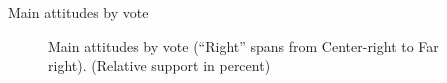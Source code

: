 \documentclass[aspectratio=169,xcolor=dvipsnames, 11pt,mathserif]{beamer}
\begin{document}
\begin{frame}{Main attitudes by vote \hyperlink{gcs_support}{}\label{gcs_vote}}
    \begin{figure}[h!] 
        \caption{Main attitudes by vote (``Right'' spans from Center-right to Far right). (Relative support in percent)}\label{fig:main_by_vote}
    \end{figure}
\end{frame}
\end{document}
